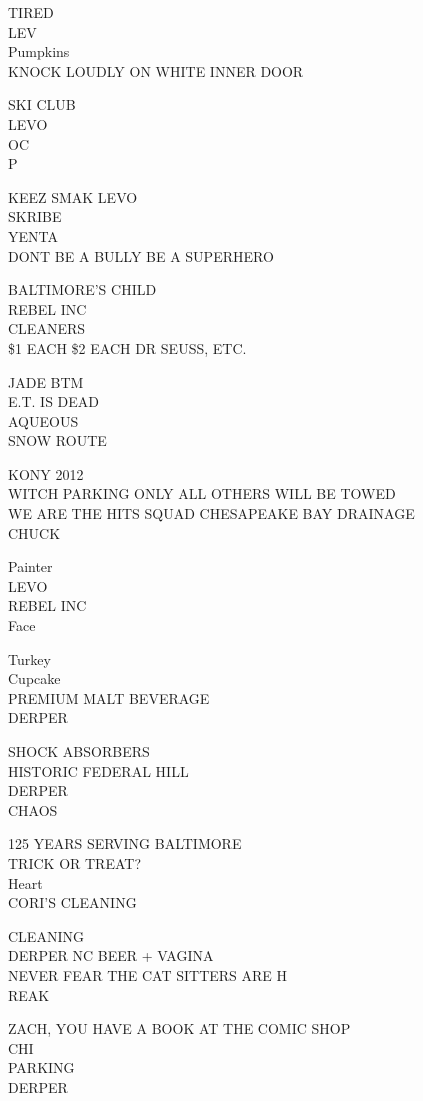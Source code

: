 \documentclass[10pt,letterpaper]{article}
\begin{document}
TIRED\\
LEV\\
Pumpkins\\
KNOCK LOUDLY ON WHITE INNER DOOR

SKI CLUB\\
LEVO\\
OC\\
P

KEEZ SMAK LEVO\\
SKRIBE\\
YENTA\\
DONT BE A BULLY BE A SUPERHERO

BALTIMORE'S CHILD\\
REBEL INC\\
CLEANERS\\
\$1 EACH \$2 EACH DR SEUSS, ETC.

JADE BTM\\
E.T. IS DEAD\\
AQUEOUS\\
SNOW ROUTE

KONY 2012\\
WITCH PARKING ONLY ALL OTHERS WILL BE TOWED\\
WE ARE THE HITS SQUAD CHESAPEAKE BAY DRAINAGE\\
CHUCK

Painter\\
LEVO\\
REBEL INC\\
Face

Turkey\\
Cupcake\\
PREMIUM MALT BEVERAGE\\
DERPER

SHOCK ABSORBERS\\
HISTORIC FEDERAL HILL\\
DERPER\\
CHAOS

125 YEARS SERVING BALTIMORE\\
TRICK OR TREAT?\\
Heart\\
CORI'S CLEANING

CLEANING\\
DERPER NC BEER + VAGINA\\
NEVER FEAR THE CAT SITTERS ARE H\\
REAK

ZACH, YOU HAVE A BOOK AT THE COMIC SHOP\\
CHI\\
PARKING\\
DERPER
\end{document}
